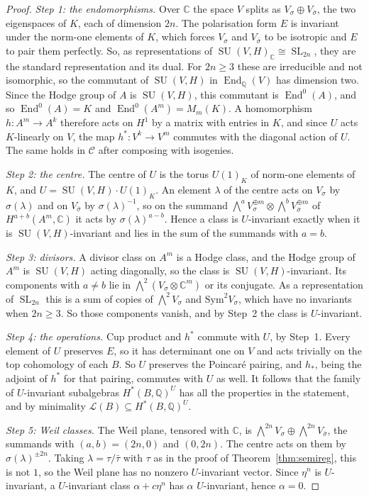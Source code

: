 \documentclass[11pt]{amsart}
\theoremstyle{definition}
\theoremstyle{remark}
\newcommand{\QQ}{\mathbb{Q}}
\newcommand{\CC}{\mathbb{C}}
\newcommand{\SL}{\operatorname{SL}}
\newcommand{\End}{\operatorname{End}}
\newcommand{\SU}{\operatorname{SU}}
\begin{document}
\begin{proof}
\emph{Step 1: the endomorphisms.} Over $\CC$ the space $V$ splits as
$V_{\sigma}\oplus V_{\bar\sigma}$, the two eigenspaces of $K$, each of
dimension $2n$. The polarisation form $E$ is invariant under the norm-one
elements of $K$, which forces $V_{\sigma}$ and $V_{\bar\sigma}$ to be
isotropic and $E$ to pair them perfectly. So, as representations of
$\SU(V,H)_{\CC}\cong\SL_{2n}$, they are the standard representation and its
dual. For $2n\ge3$ these are irreducible and not isomorphic, so the
commutant of $\SU(V,H)$ in $\End_{\QQ}(V)$ has dimension two. Since the
Hodge group of $A$ is $\SU(V,H)$, this commutant is $\End^{0}(A)$, and so
$\End^{0}(A)=K$ and $\End^{0}(A^{m})=M_{m}(K)$. A homomorphism
$h\colon A^{m}\to A^{k}$ therefore acts on $H^{1}$ by a matrix with entries
in $K$, and since $U$ acts $K$-linearly on $V$, the map
$h^{*}\colon V^{k}\to V^{m}$ commutes with the diagonal action of $U$. The
same holds in $\mathcal C$ after composing with isogenies.

\emph{Step 2: the centre.} The centre of $U$ is the torus $U(1)_{K}$ of
norm-one elements of $K$, and $U=\SU(V,H)\cdot U(1)_{K}$. An element
$\lambda$ of the centre acts on $V_{\sigma}$ by $\sigma(\lambda)$ and on
$V_{\bar\sigma}$ by $\sigma(\lambda)^{-1}$, so on the summand
$\bigwedge^{a}V_{\sigma}^{\oplus m}\otimes\bigwedge^{b}V_{\bar\sigma}^{\oplus m}$
of $H^{a+b}(A^{m},\CC)$ it acts by $\sigma(\lambda)^{a-b}$. Hence a class is
$U$-invariant exactly when it is $\SU(V,H)$-invariant and lies in the sum of
the summands with $a=b$.

\emph{Step 3: divisors.} A divisor class on $A^{m}$ is a Hodge class, and
the Hodge group of $A^{m}$ is $\SU(V,H)$ acting diagonally, so the class is
$\SU(V,H)$-invariant. Its components with $a\ne b$ lie in
$\bigwedge^{2}(V_{\sigma}\otimes\CC^{m})$ or its conjugate. As a
representation of $\SL_{2n}$ this is a sum of copies of
$\bigwedge^{2}V_{\sigma}$ and $\mathrm{Sym}^{2}V_{\sigma}$, which have no
invariants when $2n\ge3$. So those components vanish, and by Step~2 the
class is $U$-invariant.

\emph{Step 4: the operations.} Cup product and $h^{*}$ commute with $U$, by
Step~1. Every element of $U$ preserves $E$, so it has determinant one on $V$
and acts trivially on the top cohomology of each $B$. So $U$ preserves the
Poincar\'e pairing, and $h_{*}$, being the adjoint of $h^{*}$ for that
pairing, commutes with $U$ as well. It follows that the family of
$U$-invariant subalgebras $H^{*}(B,\QQ)^{U}$ has all the properties in the
statement, and by minimality $\mathcal L(B)\subseteq H^{*}(B,\QQ)^{U}$.

\emph{Step 5: Weil classes.} The Weil plane, tensored with $\CC$, is
$\bigwedge^{2n}V_{\sigma}\oplus\bigwedge^{2n}V_{\bar\sigma}$, the summands
with $(a,b)=(2n,0)$ and $(0,2n)$. The centre acts on them by
$\sigma(\lambda)^{\pm2n}$. Taking $\lambda=\tau/\bar\tau$ with $\tau$ as in
the proof of Theorem~\ref{thm:semireg}, this is not $1$, so the Weil plane
has no nonzero $U$-invariant vector. Since $\eta^{n}$ is $U$-invariant, a
$U$-invariant class $\alpha+c\eta^{n}$ has $\alpha$ $U$-invariant, hence
$\alpha=0$.
\end{proof}
\end{document}
